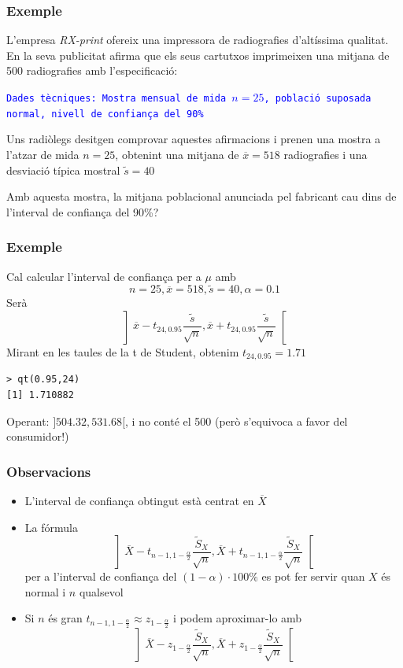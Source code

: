 \documentclass[12pt,t]{beamer}
\newcommand{\blue}[1]{\textcolor{blue}{#1}}
\renewcommand{\emph}[1]{{\color{red}#1}}
\theoremstyle{plain}
\theoremstyle{definition}
\begin{document}
\begin{frame}
\frametitle{Exemple}

L'empresa \textsl{RX-print} ofereix una impressora de radiografies d'altíssima qualitat. En la seva publicitat afirma que els seus
cartutxos imprimeixen una mitjana de 500 radiografies amb l'especificació: 
\medskip

\blue{\texttt{Dades tècniques: Mostra mensual de mida $n=25$,
població suposada normal, nivell de confiança del 90\%}}
\medskip 

Uns radiòlegs desitgen comprovar aquestes afirmacions i prenen una
mostra a l'atzar de mida $n=25$, obtenint
una mitjana de $\overline{x}=518$ radiografies i una desviació típica mostral
$\widetilde{s}=40$
\medskip

Amb aquesta mostra, la mitjana poblacional anunciada pel fabricant cau dins de l'interval de confiança del 90\%?
\end{frame}

\begin{frame}[fragile]
\frametitle{Exemple}
Cal calcular l'interval de confiança per a $\mu$ amb 
$$
n=25, \overline{x}=518, \widetilde{s}=40, \alpha=0.1
$$
Serà
$$
\left] 
\overline{x}-t_{24,0.95} \frac{\widetilde{s}}{\sqrt{n}},
\overline{x}+t_{24,0.95} \frac{\widetilde{s}}{\sqrt{n}}\right[
$$
Mirant en les taules de la t de Student, obtenim $t_{24,0.95}=1.71$
\begin{verbatim}
> qt(0.95,24)
[1] 1.710882
\end{verbatim}

Operant: $]504.32,531.68[$, i no conté el 500 (però s'equivoca a favor del consumidor!)
\end{frame}

\begin{frame}
\frametitle{Observacions}

\begin{itemize}
\item L'interval de confiança obtingut està centrat en $\overline{X}$
\medskip

\item La fórmula
$$
\left] 
\overline{X}-t_{n-1,1-\frac{\alpha}{2}} \frac{\widetilde{S}_{X}}{\sqrt{n}},
\overline{X}+t_{n-1,1-\frac{\alpha}{2}}\frac{\widetilde{S}_{X}}{\sqrt{n}} \right[
$$
per a l'interval de confiança del $(1-\alpha)\cdot 100\%$ es pot fer servir quan $X$ és normal i $n$ qualsevol
\bigskip


\item Si $n$ és gran $t_{n-1,1-\frac{\alpha}{2}}\approx z_{1-\frac{\alpha}{2}}$ i podem \emph{aproximar-lo} amb
$$
\left] 
\overline{X}-z_{1-\frac{\alpha}{2}} \frac{\widetilde{S}_{X}}{\sqrt{n}},
\overline{X}+z_{1-\frac{\alpha}{2}}\frac{\widetilde{S}_{X}}{\sqrt{n}} \right[
$$
\end{itemize}


\end{frame}
\end{document}
